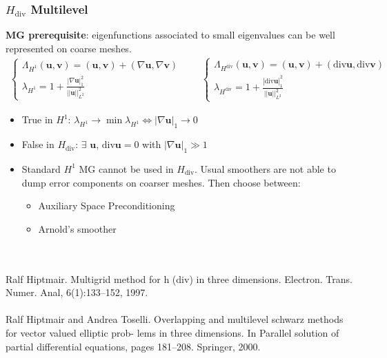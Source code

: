 \documentclass[8pt, oneside]{beamer}   	%
\newcommand{\bv}{\textbf{v}}
\newcommand{\bu}{\textbf{u}}
\begin{document}
\begin{frame}
\frametitle{\textbf{$H_{\text{div}}$ Multilevel}}
\textbf{MG prerequisite}: eigenfunctions associated to small eigenvalues can be well represented on coarse meshes.
\begin{align*}
\begin{cases}
\Lambda_{H^1}(\bu,\bv)=(\bu,\bv)+(\nabla \bu,\nabla \bv) \\
\lambda_{H^1}=1+\frac{|\nabla \bu|_1^2}{||\bu||_{L^2}^2}
\end{cases}
\qquad 
\begin{cases}
\Lambda_{H^{\text{div}}}(\bu,\bv)=(\bu,\bv)+(\text{div} \bu,\text{div} \bv)\\
\lambda_{H^{\text{div}}}=1+\frac{|\text{div} \bu|_1^2}{||\bu||_{L^2}^2}
\end{cases}
\end{align*}
\begin{itemize}
\item True in $H^1$: $\lambda_{H^1} \to \min \lambda_{H^1} \iff |\nabla \bu|_1 \to 0$
\item False in $H_{\text{div}}$: $\exists$ $\bu$, $\text{div} \bu = 0$ with $|\nabla \bu|_1 \gg 1$
\item Standard $H^1$ MG cannot be used in $H_{\text{div}}$. Usual smoothers are not able to dump error components on coarser meshes. Then choose between:
\begin{itemize}
\item Auxiliary Space Preconditioning
\item Arnold's smoother
\end{itemize}
\end{itemize}
${}$\\
${}$\\
\footnotesize{Ralf Hiptmair. Multigrid method for h (div) in three dimensions. Electron. Trans. Numer. Anal, 6(1):133–152, 1997.}${}$\\
${}$\\
\footnotesize{Ralf Hiptmair and Andrea Toselli. Overlapping and multilevel schwarz methods for vector valued elliptic prob- lems in three dimensions. In Parallel solution of partial differential equations, pages 181–208. Springer, 2000.}
\end{frame}
\end{document}
